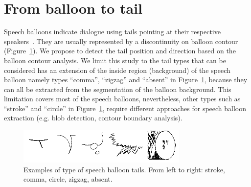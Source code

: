 

\section{From balloon to tail} %
\label{sec:se:from_balloon_to_tail}


Speech balloons indicate dialogue using tails pointing at their respective speakers~\cite{Varnum2007Language}.
They are usually represented by a discontinuity on balloon contour (Figure~\ref{fig:se:tail_types}). 
We propose to detect the tail position and direction based on the balloon contour analysis.
We limit this study to the tail types that can be considered has an extension of the inside region (background) of the speech balloon namely types ``comma'', ``zigzag'' and ``absent'' in Figure~\ref{fig:se:tail_types}, because they can all be extracted from the segmentation of the balloon background.
This limitation covers most of the speech balloons, nevertheless, other types such as ``stroke'' and ``circle'' in Figure~\ref{fig:se:tail_types}, require different approaches for speech balloon extraction (e.g. blob detection, contour boundary analysis).

    \begin{figure}[ht]%
      \centering
      \includegraphics[trim= 0px 0px 0mm 0mm, clip, width=0.75\textwidth]{tail_types.png}
    \caption[Examples of type of speech balloon tails]{Examples of type of speech balloon tails. From left to right: stroke, comma, circle, zigzag, absent.}
    \label{fig:se:tail_types}
    \end{figure}

